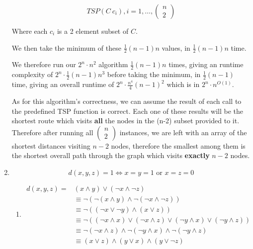 \documentclass{article}
\begin{document}
\begin{enumerate}
        \[
        TSP(C\ c_{i}), i = 1,\ldots,\begin{pmatrix}
          n \\ 2
        \end{pmatrix}
        \]

        Where each $c_{i}$ is a 2 element subset of $C$.

        We then take the minimum of these $\frac{1}{2}(n-1)n$ values, in $\frac{1}{2}(n-1)n$ time.

        We therefore run our $2^{n}\cdot n^{2}$ algorithm $\frac{1}{2}(n-1)n$ times, giving an runtime complexity of $2^{n} \cdot \frac{1}{2}(n-1)n^{3}$ before taking the minimum, in $\frac{1}{2}(n-1)$ time, giving an overall runtime of $2^{n} \cdot \frac{n^{4}}{4}(n-1)^{2}$ which is in $2^{n} \cdot n^{O(1)}$.


        As for this algorithm's correctness, we can assume the result of each call to the predefined TSP function is correct. Each one of these results will be the shortest route which visits \textbf{all} the nodes in the (n-2) subset provided to it. Therefore after running all $\begin{pmatrix}
          n\\2
        \end{pmatrix}$ instances, we are left with an array of the shortest distances visiting $n-2$ nodes, therefore the smallest among them is the shortest overall path through the graph which visits \textbf{exactly} $n-2$ nodes.


  \item
        \[
        d(x,y,z) = 1 \Longleftrightarrow x = y = 1 \text{ or } x = z = 0
        \]

        \begin{enumerate}
          \item
                \begin{align*}
                  d(x,y,z) = &(x \wedge y) \vee (\neg x \wedge \neg z) \\
                  &\equiv \neg ( \neg ( x \wedge y ) \wedge \neg (\neg x \wedge \neg z) ) \\
                  &\equiv \neg ((\neg x \vee \neg y) \wedge (x \vee z)) \\
                  &\equiv \neg ((\neg x \wedge x) \vee (\neg x \wedge z) \vee (\neg y \wedge x) \vee (\neg y \wedge z)) \\
                  &\equiv \neg (\neg x \wedge z) \wedge \neg ( \neg y \wedge x ) \wedge \neg (\neg y \wedge z) \\
                  &\equiv (x \vee z) \wedge (y \vee x) \wedge (y \vee \neg z)
                \end{align*}


\end{enumerate}
\end{enumerate}
\end{document}
